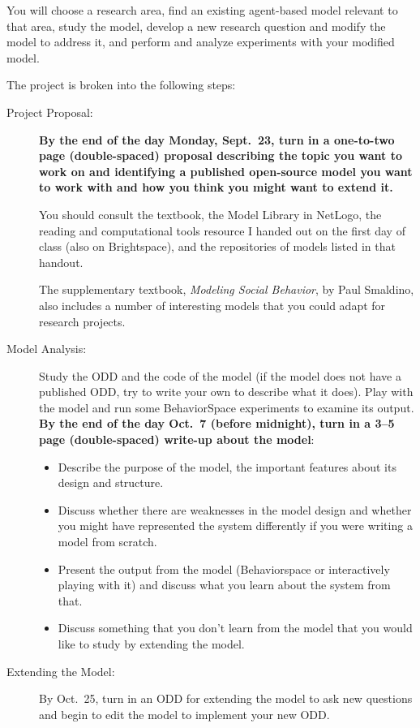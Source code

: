 \documentclass{jghandout}
\date{\longduedate}
\begin{document}
    \maketitle

\noindent
You will choose a research area, find an existing agent-based model relevant to
that area, study the model, develop a new research question and modify the model
to address it, and perform and analyze experiments with your modified model.

The project is broken into the following steps:
\begin{description}
  \item[Project Proposal:] \textbf{By the end of the day Monday, Sept.~23, turn
   in a one-to-two page (double-spaced) proposal describing the topic you want
   to work on and identifying a published open-source model you want to work
   with and how you think you might want to extend it.}

    You should consult the textbook, the Model Library in NetLogo, the reading
    and computational tools resource I handed out on the first day of class
    (also on Brightspace), and the repositories of models listed in that
    handout.

    The supplementary textbook, \emph{Modeling Social Behavior}, by
    Paul Smaldino, also includes a number of interesting models that you could
    adapt for research projects.

    \item[Model Analysis:] Study the ODD and the code of the model (if the model
     does not have a published ODD, try to write your own to describe what it
     does). Play with the model and run some BehaviorSpace experiments to examine
     its output.
    \textbf{By the end of the day Oct.~7 (before midnight), turn in a 3--5 page
     (double-spaced) write-up about the model}:
    \begin{itemize}
      \item Describe the purpose of the model, the important features about its
       design and structure.
      \item Discuss whether there are weaknesses in the model design and whether
       you might have represented the system differently if you were writing a
       model from scratch.
      \item Present the output from the model (Behaviorspace or interactively
      playing with it) and discuss what you learn about the system from that.
      \item Discuss something that you don't learn from the  model that you
      would like to study by extending the model.
    \end{itemize}
    \item[Extending the Model:] By Oct.~25, turn in an ODD for extending the model
    to ask new questions and begin to edit the model to implement your new ODD.


\end{description}
\end{document}
